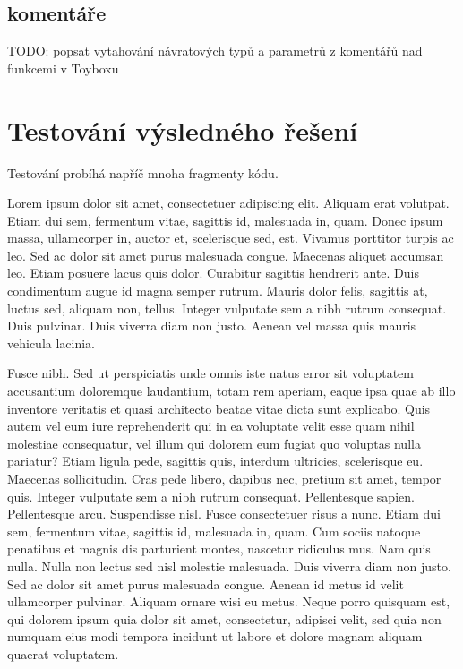 \documentclass[czech,master,dept460,male,cpp,cpdeclaration]{diploma}
\begin{document}
\subsection{komentáře}
TODO: popsat vytahování návratových typů a parametrů z komentářů nad funkcemi v Toyboxu

\section{Testování výsledného řešení}
Testování probíhá napříč mnoha fragmenty kódu.


Lorem ipsum dolor sit amet, consectetuer adipiscing elit. Aliquam erat volutpat. Etiam dui sem, fermentum vitae, sagittis id, malesuada in, quam. Donec ipsum massa, ullamcorper in, auctor et, scelerisque sed, est. Vivamus porttitor turpis ac leo. Sed ac dolor sit amet purus malesuada congue. Maecenas aliquet accumsan leo. Etiam posuere lacus quis dolor. Curabitur sagittis hendrerit ante. Duis condimentum augue id magna semper rutrum. Mauris dolor felis, sagittis at, luctus sed, aliquam non, tellus. Integer vulputate sem a nibh rutrum consequat. Duis pulvinar. Duis viverra diam non justo. Aenean vel massa quis mauris vehicula lacinia.

Fusce nibh. Sed ut perspiciatis unde omnis iste natus error sit voluptatem accusantium doloremque laudantium, totam rem aperiam, eaque ipsa quae ab illo inventore veritatis et quasi architecto beatae vitae dicta sunt explicabo. Quis autem vel eum iure reprehenderit qui in ea voluptate velit esse quam nihil molestiae consequatur, vel illum qui dolorem eum fugiat quo voluptas nulla pariatur? Etiam ligula pede, sagittis quis, interdum ultricies, scelerisque eu. Maecenas sollicitudin. Cras pede libero, dapibus nec, pretium sit amet, tempor quis. Integer vulputate sem a nibh rutrum consequat. Pellentesque sapien. Pellentesque arcu. Suspendisse nisl. Fusce consectetuer risus a nunc. Etiam dui sem, fermentum vitae, sagittis id, malesuada in, quam. Cum sociis natoque penatibus et magnis dis parturient montes, nascetur ridiculus mus. Nam quis nulla. Nulla non lectus sed nisl molestie malesuada. Duis viverra diam non justo. Sed ac dolor sit amet purus malesuada congue. Aenean id metus id velit ullamcorper pulvinar. Aliquam ornare wisi eu metus. Neque porro quisquam est, qui dolorem ipsum quia dolor sit amet, consectetur, adipisci velit, sed quia non numquam eius modi tempora incidunt ut labore et dolore magnam aliquam quaerat voluptatem.
\end{document}
